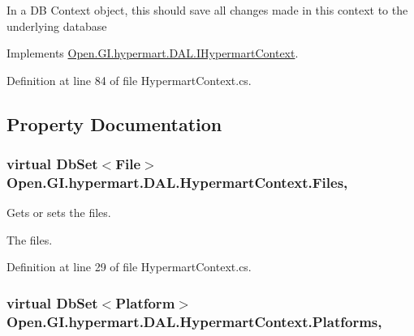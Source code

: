 In a D\+B Context object, this should save all changes made in this context to the underlying database 



Implements \hyperlink{interface_open_1_1_g_i_1_1hypermart_1_1_d_a_l_1_1_i_hypermart_context_aacc5015260d97950f2a10d7673873304}{Open.\+G\+I.\+hypermart.\+D\+A\+L.\+I\+Hypermart\+Context}.



Definition at line 84 of file Hypermart\+Context.\+cs.



\subsection{Property Documentation}
\hypertarget{class_open_1_1_g_i_1_1hypermart_1_1_d_a_l_1_1_hypermart_context_aa42b145ebbfe133c3bc2beddfb23de36}{}
\subsubsection[{Files}]{\setlength{\rightskip}{0pt plus 5cm}virtual Db\+Set$<${\bf File}$>$ Open.\+G\+I.\+hypermart.\+D\+A\+L.\+Hypermart\+Context.\+Files\hspace{0.3cm}{\ttfamily [get]}, {\ttfamily [set]}}\label{class_open_1_1_g_i_1_1hypermart_1_1_d_a_l_1_1_hypermart_context_aa42b145ebbfe133c3bc2beddfb23de36}


Gets or sets the files. 

The files. 

Definition at line 29 of file Hypermart\+Context.\+cs.

\hypertarget{class_open_1_1_g_i_1_1hypermart_1_1_d_a_l_1_1_hypermart_context_aff4be9e14ae1b0224c5a7b780050222f}{}
\subsubsection[{Platforms}]{\setlength{\rightskip}{0pt plus 5cm}virtual Db\+Set$<${\bf Platform}$>$ Open.\+G\+I.\+hypermart.\+D\+A\+L.\+Hypermart\+Context.\+Platforms\hspace{0.3cm}{\ttfamily [get]}, {\ttfamily [set]}}\label{class_open_1_1_g_i_1_1hypermart_1_1_d_a_l_1_1_hypermart_context_aff4be9e14ae1b0224c5a7b780050222f}


